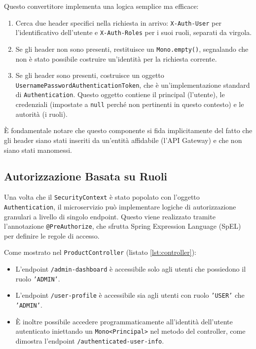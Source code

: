 

Questo convertitore implementa una logica semplice ma efficace:
\begin{enumerate}
    \item Cerca due header specifici nella richiesta in arrivo: \texttt{X-Auth-User} per l'identificativo dell'utente e \texttt{X-Auth-Roles} per i suoi ruoli, separati da virgola.
    \item Se gli header non sono presenti, restituisce un \texttt{Mono.empty()}, segnalando che non è stato possibile costruire un'identità per la richiesta corrente.
    \item Se gli header sono presenti, costruisce un oggetto \texttt{UsernamePasswordAuthenticationToken}, che è un'implementazione standard di \texttt{Authentication}. Questo oggetto contiene il principal (l'utente), le credenziali (impostate a \texttt{null} perché non pertinenti in questo contesto) e le autorità (i ruoli).
\end{enumerate}

È fondamentale notare che questo componente si fida implicitamente del fatto che gli header siano stati inseriti da un'entità affidabile (l'API Gateway) e che non siano stati manomessi.

\subsection{Autorizzazione Basata su Ruoli}
Una volta che il \texttt{SecurityContext} è stato popolato con l'oggetto \texttt{Authentication}, il microservizio può implementare logiche di autorizzazione granulari a livello di singolo endpoint. Questo viene realizzato tramite l'annotazione \texttt{@PreAuthorize}, che sfrutta Spring Expression Language (SpEL) per definire le regole di accesso.



Come mostrato nel \texttt{ProductController} (listato \ref{lst:controller}):
\begin{itemize}
    \item L'endpoint \texttt{/admin-dashboard} è accessibile solo agli utenti che possiedono il ruolo \texttt{'ADMIN'}.
    \item L'endpoint \texttt{/user-profile} è accessibile sia agli utenti con ruolo \texttt{'USER'} che \texttt{'ADMIN'}.
    \item È inoltre possibile accedere programmaticamente all'identità dell'utente autenticato iniettando un \texttt{Mono<Principal>} nel metodo del controller, come dimostra l'endpoint \texttt{/authenticated-user-info}.
\end{itemize}

